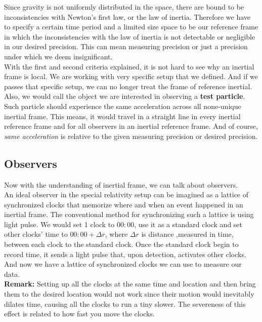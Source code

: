 \documentclass[12pt]{book}
\begin{document}
\newline
Since gravity is not uniformly distributed in the space, there are bound to be inconsistencies with Newton's first law, or the law of inertia. Therefore we have to specify a certain time period and a limited size space to be our reference frame in which the inconsistencies with the law of inertia is not detectable or negligible in our desired precision. This can mean measuring precision or just a precision under which we deem insignificant. \\
\newline
With the first and second criteria explained, it is not hard to see why an inertial frame is local. We are working with very specific setup that we defined. And if we passes that specific setup, we can no longer treat the frame of reference inertial.\\
\newline
Also, we would call the object we are interested in observing a \textbf{test particle}. Such particle should experience the same acceleration across all none-unique inertial frame. This means, it would travel in a straight line in every inertial reference frame and for all observers in an inertial reference frame. And of course, \textit{same acceleration} is relative to the given measuring precision or desired precision. 

\subsection{Observers}
Now with the understanding of inertial frame, we can talk about observers.\\
\newline
An ideal observer in the special relativity setup can be imagined as a lattice of synchronized clocks that memorize where and when an event happened in an inertial frame. The conventional method for synchronizing such a lattice is using light pulse. We would set 1 clock to $00:00$, use it as a standard clock and set other clocks' time to $00:00+\Delta r$, where $\Delta r$ is distance ,measured in time, between each clock to the standard clock. Once the standard clock begin to record time, it sends a light pulse that, upon detection, activates other clocks. And now we have a lattice of synchronized clocks we can use to measure our data.\\
\newline
\textbf{Remark:} Setting up all the clocks at the same time and location and then bring them to the desired location would not work since their motion would inevitably dilates time, causing all the clocks to run a tiny slower. The severeness of this effect is related to how fast you move the clocks. 
\end{document}
